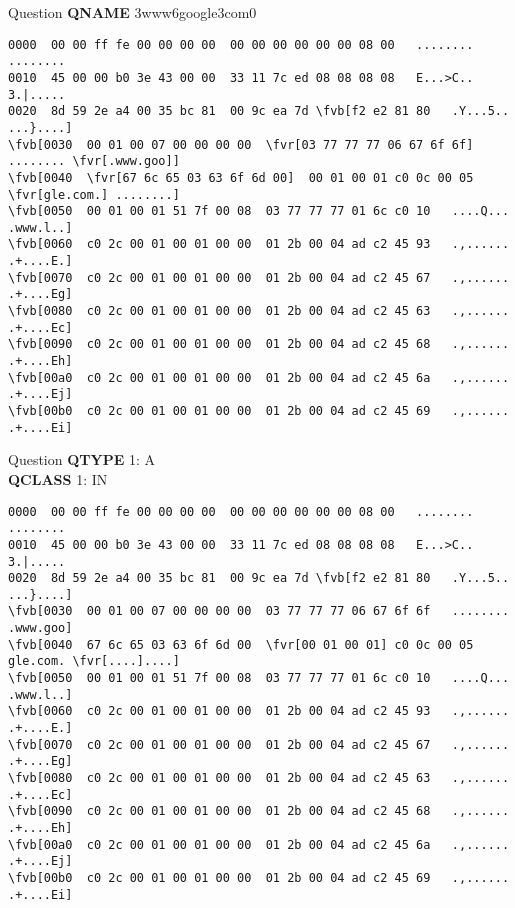 \documentclass{beamer}
\newcommand*{\fvr}[1]{\textcolor{red}{#1}}
\newcommand*{\fvb}[1]{\textcolor{blue}{#1}}
\begin{document}
  \begin{frame}[fragile]{\mytitle}{Question}
    \textbf{QNAME} 3www6google3com0
    \vfill
    \tiny
    \begin{Verbatim}[commandchars=\\\[\]]
0000  00 00 ff fe 00 00 00 00  00 00 00 00 00 00 08 00   ........ ........
0010  45 00 00 b0 3e 43 00 00  33 11 7c ed 08 08 08 08   E...>C.. 3.|.....
0020  8d 59 2e a4 00 35 bc 81  00 9c ea 7d \fvb[f2 e2 81 80   .Y...5.. ...}....]
\fvb[0030  00 01 00 07 00 00 00 00  \fvr[03 77 77 77 06 67 6f 6f]   ........ \fvr[.www.goo]]
\fvb[0040  \fvr[67 6c 65 03 63 6f 6d 00]  00 01 00 01 c0 0c 00 05   \fvr[gle.com.] ........]
\fvb[0050  00 01 00 01 51 7f 00 08  03 77 77 77 01 6c c0 10   ....Q... .www.l..]
\fvb[0060  c0 2c 00 01 00 01 00 00  01 2b 00 04 ad c2 45 93   .,...... .+....E.]
\fvb[0070  c0 2c 00 01 00 01 00 00  01 2b 00 04 ad c2 45 67   .,...... .+....Eg]
\fvb[0080  c0 2c 00 01 00 01 00 00  01 2b 00 04 ad c2 45 63   .,...... .+....Ec]
\fvb[0090  c0 2c 00 01 00 01 00 00  01 2b 00 04 ad c2 45 68   .,...... .+....Eh]
\fvb[00a0  c0 2c 00 01 00 01 00 00  01 2b 00 04 ad c2 45 6a   .,...... .+....Ej]
\fvb[00b0  c0 2c 00 01 00 01 00 00  01 2b 00 04 ad c2 45 69   .,...... .+....Ei]
    \end{Verbatim}
\end{frame}

  \begin{frame}[fragile]{\mytitle}{Question}
    \textbf{QTYPE} 1: A \\
    \textbf{QCLASS} 1: IN
    \vfill
    \tiny
    \begin{Verbatim}[commandchars=\\\[\]]
0000  00 00 ff fe 00 00 00 00  00 00 00 00 00 00 08 00   ........ ........
0010  45 00 00 b0 3e 43 00 00  33 11 7c ed 08 08 08 08   E...>C.. 3.|.....
0020  8d 59 2e a4 00 35 bc 81  00 9c ea 7d \fvb[f2 e2 81 80   .Y...5.. ...}....]
\fvb[0030  00 01 00 07 00 00 00 00  03 77 77 77 06 67 6f 6f   ........ .www.goo]
\fvb[0040  67 6c 65 03 63 6f 6d 00  \fvr[00 01 00 01] c0 0c 00 05   gle.com. \fvr[....]....]
\fvb[0050  00 01 00 01 51 7f 00 08  03 77 77 77 01 6c c0 10   ....Q... .www.l..]
\fvb[0060  c0 2c 00 01 00 01 00 00  01 2b 00 04 ad c2 45 93   .,...... .+....E.]
\fvb[0070  c0 2c 00 01 00 01 00 00  01 2b 00 04 ad c2 45 67   .,...... .+....Eg]
\fvb[0080  c0 2c 00 01 00 01 00 00  01 2b 00 04 ad c2 45 63   .,...... .+....Ec]
\fvb[0090  c0 2c 00 01 00 01 00 00  01 2b 00 04 ad c2 45 68   .,...... .+....Eh]
\fvb[00a0  c0 2c 00 01 00 01 00 00  01 2b 00 04 ad c2 45 6a   .,...... .+....Ej]
\fvb[00b0  c0 2c 00 01 00 01 00 00  01 2b 00 04 ad c2 45 69   .,...... .+....Ei]
    \end{Verbatim}
\end{frame}
\end{document}
